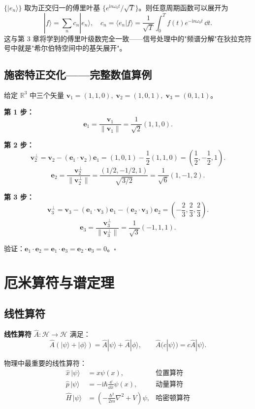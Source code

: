 \begin{example}[狄拉克符号与傅里叶级数]
$\{|e_n\rangle\}$ 取为正交归一的傅里叶基 $\{e^{\mathrm{i}n\omega_0 t}/\sqrt{T}\}$。则任意周期函数可以展开为
\[
|f\rangle = \sum_n c_n |e_n\rangle,\quad
c_n = \langle e_n|f\rangle = \frac{1}{\sqrt{T}}\int_0^T f(t)e^{-\mathrm{i}n\omega_0 t}\,\dd t.
\]
这与第 3 章将学到的傅里叶级数完全一致——信号处理中的"频谱分解"在狄拉克符号中就是"希尔伯特空间中的基矢展开"。
\end{example}

\subsection{施密特正交化——完整数值算例}

给定 $\mathbb{R}^3$ 中三个矢量 $\mathbf{v}_1=(1,1,0),\;\mathbf{v}_2=(1,0,1),\;\mathbf{v}_3=(0,1,1)$。

\textbf{第 1 步：}
\[
\mathbf{e}_1 = \frac{\mathbf{v}_1}{\|\mathbf{v}_1\|} = \frac{1}{\sqrt{2}}(1,1,0).
\]

\textbf{第 2 步：}
\[
\mathbf{v}_2^\perp = \mathbf{v}_2 - (\mathbf{e}_1\cdot\mathbf{v}_2)\mathbf{e}_1 = (1,0,1) - \frac12(1,1,0) = \left(\frac12,-\frac12,1\right).
\]
\[
\mathbf{e}_2 = \frac{\mathbf{v}_2^\perp}{\|\mathbf{v}_2^\perp\|} = \frac{(1/2,-1/2,1)}{\sqrt{3/2}} = \frac{1}{\sqrt{6}}(1,-1,2).
\]

\textbf{第 3 步：}
\[
\mathbf{v}_3^\perp = \mathbf{v}_3 - (\mathbf{e}_1\cdot\mathbf{v}_3)\mathbf{e}_1 - (\mathbf{e}_2\cdot\mathbf{v}_3)\mathbf{e}_2 = \left(-\frac23,\frac23,\frac23\right).
\]
\[
\mathbf{e}_3 = \frac{\mathbf{v}_3^\perp}{\|\mathbf{v}_3^\perp\|} = \frac{1}{\sqrt{3}}(-1,1,1).
\]

验证：$\mathbf{e}_1\cdot\mathbf{e}_2 = \mathbf{e}_1\cdot\mathbf{e}_3 = \mathbf{e}_2\cdot\mathbf{e}_3 = 0$。$\square$

\section{厄米算符与谱定理}

\subsection{线性算符}

\textbf{线性算符} $\hat{A}: \mathcal{H}\to\mathcal{H}$ 满足：
\[
\hat{A}(|\psi\rangle+|\phi\rangle) = \hat{A}|\psi\rangle + \hat{A}|\phi\rangle,\qquad
\hat{A}(c|\psi\rangle) = c\hat{A}|\psi\rangle.
\]

物理中最重要的线性算符：
\begin{align*}
\hat{x}\,|\psi\rangle &= x\psi(x), &\text{位置算符}\\
\hat{p}\,|\psi\rangle &= -\mathrm{i}\hbar\frac{\dd}{\dd x}\psi(x), &\text{动量算符}\\
\hat{H}\,|\psi\rangle &= \left(-\frac{\hbar^2}{2m}\nabla^2 + V\right)\psi, &\text{哈密顿算符}
\end{align*}

